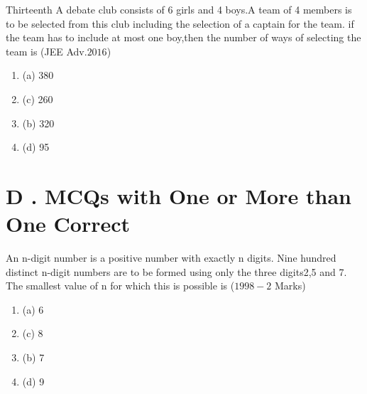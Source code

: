 \documentclass[journal,12pt,twocolumn]{IEEEtran}
\theoremstyle{remark}
\begin{document}
\begin{enumerate}[start=3]
{\begin{multicols}{2}
\begin{enumerate}
\end{enumerate}
\end{multicols}
\item Thirteenth A debate club consists of 6 girls and 4 boys.A team of 4 members is to be selected from this club including the selection of a captain for the team. if the team has to include at most one boy,then the number of ways of selecting the team is
\hfill{(JEE Adv.$2016$)}\\
\begin{multicols}{2} 
\begin{enumerate}
[label=, left=0pt, labelsep=0pt, itemsep=1em]
\item (a) 380\item (c) 260\item(b) 320\item (d) 95
\end{enumerate}
\end{multicols}
\section*{D . MCQs with One or More than One Correct}
\item [1.] An n-digit number is a positive number with exactly n digits. Nine hundred distinct n-digit numbers are to be formed using only the three digits2,5 and 7. The smallest value of n for which  this is possible is
\hfill{($1998-2$ Marks)}\\
\begin{multicols}{2} 
\begin{enumerate}
[label=, left=0pt, labelsep=0pt, itemsep=1em]
\item (a) 6\item  (c) 8\item(b) 7\item (d) 9\\
\end{enumerate}
\end{multicols}
}
\end{enumerate}
\end{document}
